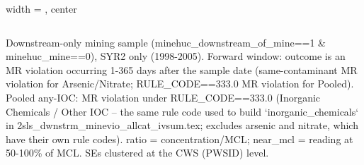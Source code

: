 \begin{table}[htbp]
\begin{adjustbox}{width = \textwidth, center}
\begin{tabular}{lccc}
         \bottomrule
         
      \end{tabular}
      
      
      
   \end{adjustbox}
      {\tiny\linespread{1}\selectfont \par \raggedright 
   Downstream-only mining sample (minehuc\_downstream\_of\_mine==1 \& minehuc\_mine==0), SYR2 only (1998-2005). Forward window: outcome is an MR violation occurring 1-365 days after the sample date (same-contaminant MR violation for Arsenic/Nitrate; RULE\_CODE==333.0 MR violation for Pooled). Pooled any-IOC: MR violation under RULE\_CODE==333.0 (Inorganic Chemicals / Other IOC -- the same rule code used to build `inorganic\_chemicals` in 2sls\_dwnstrm\_minevio\_allcat\_ivsum.tex; excludes arsenic and nitrate, which have their own rule codes). ratio = concentration/MCL; near\_mcl = reading at 50-100\% of MCL. SEs clustered at the CWS (PWSID) level.}
   
\end{table}


